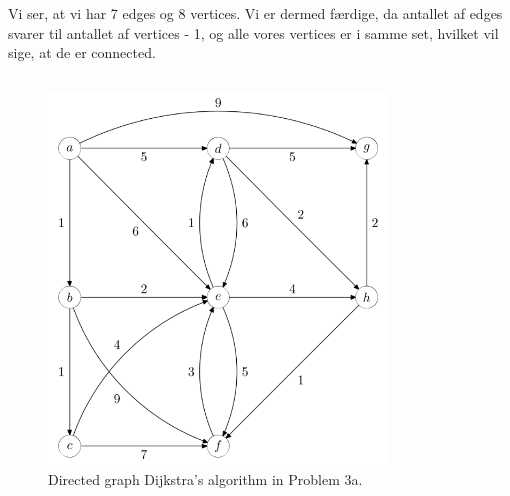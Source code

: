 \documentclass[a4paper,12pt]{article}
\begin{document}
Vi ser, at vi har 7 edges og 8 vertices. Vi er dermed færdige, da antallet af edges svarer til antallet af vertices - 1, og alle vores vertices er i samme set, hvilket vil sige, at de er connected.


\subsection[]{}



\subsection[]{}



\subsection[]{}



\begin{figure}[H]
    \centering
    \includegraphics[width=0.8\textwidth]{3.png}
    \caption{Directed graph Dijkstra's algorithm in Problem 3a.}
\end{figure}
\section[Question 3]{}
\subsection[]{}
\end{document}
